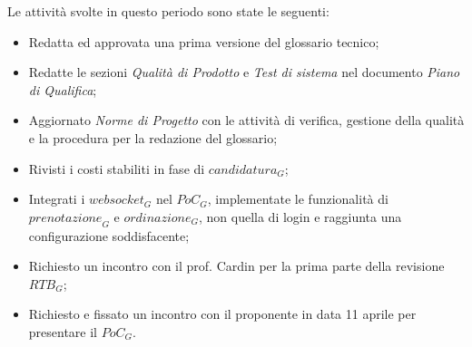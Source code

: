 Le attività svolte in questo periodo sono state le seguenti:
\begin{itemize}
    \item Redatta ed approvata una prima versione del glossario tecnico;
    \item Redatte le sezioni \emph{Qualità di Prodotto} e \emph{Test di sistema} nel documento \emph{Piano di Qualifica};
    \item Aggiornato \emph{Norme di Progetto} con le attività di verifica, gestione della qualità e la procedura per la redazione del glossario;
    \item Rivisti i costi stabiliti in fase di $\textit{candidatura}_G$;
    \item Integrati i $\textit{websocket}_G$ nel $\textit{PoC}_G$, implementate le funzionalità di $\textit{prenotazione}_G$ e $\textit{ordinazione}_G$, non quella di login e raggiunta una configurazione soddisfacente;
    \item Richiesto un incontro con il prof. Cardin per la prima parte della revisione $\textit{RTB}_G$;
    \item Richiesto e fissato un incontro con il proponente in data 11 aprile per presentare il $\textit{PoC}_G$.
\end{itemize}
